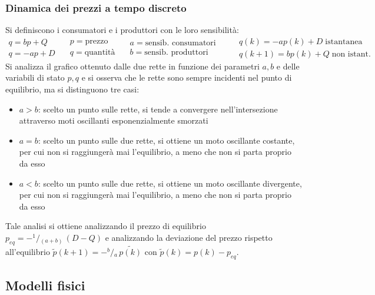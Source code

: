 \subsubsection*{Dinamica dei prezzi a tempo discreto}
Si definiscono i consumatori e i produttori con le loro sensibilità:
\[\begin{array}{l} q = b p + Q \\ q = -a p + D \end{array} \quad \begin{array}{l} p = \text{prezzo} \\ q = \text{quantità}\end{array} \quad \begin{array}{l} a = \text{sensib. consumatori} \\ b = \text{sensib. produttori}\end{array} \qquad \begin{array}{l} q(k) = -ap(k) + D \; \text{istantanea}\\ q(k\!+\!1) = bp(k) + Q \; \text{non istant.}\end{array}\]
Si analizza il grafico ottenuto dalle due rette in funzione dei parametri \(a, b\) e delle variabili di stato \(p, q\) e si
osserva che le rette sono sempre incidenti nel punto di equilibrio, ma si distinguono tre casi:
\begin{itemize}
	\item \(a > b\): scelto un punto sulle rette, si tende a convergere nell'intersezione attraverso moti oscillanti 
	esponenzialmente smorzati
	\item \(a = b\): scelto un punto sulle due rette, si ottiene un moto oscillante  costante, per cui non si
	raggiungerà mai l'equilibrio, a meno che non si parta proprio da esso
	\item \(a < b\): scelto un punto sulle due rette, si ottiene un moto oscillante  divergente, per cui non si
	raggiungerà mai l'equilibrio, a meno che non si parta proprio da esso
\end{itemize}
Tale analisi si ottiene analizzando il prezzo di equilibrio \(p_{eq} = -^1\!/\!_{(a+b)} \, (D-Q)\) e analizzando la deviazione del prezzo
rispetto all'equilibrio \(\tilde{p}(k+1) = -^b\!/\!_a \, \tilde{p(k)}\) con \(\tilde{p}(k) = p(k) - p_{eq}\).

\newpage


\subsection{Modelli fisici}
